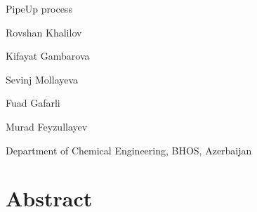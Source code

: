 \documentclass[12pt]{article}
\begin{document}
\begin{center}
	
{\fontsize{14pt}{14pt}\selectfont

PipeUp process

}	

\end{center}

Rovshan Khalilov

Kifayat Gambarova 

Sevinj Mollayeva

Fuad Gafarli

Murad Feyzullayev

\begin{center}
	Department of Chemical Engineering, BHOS, Azerbaijan
\end{center}


\section*{Abstract}
\end{document}
